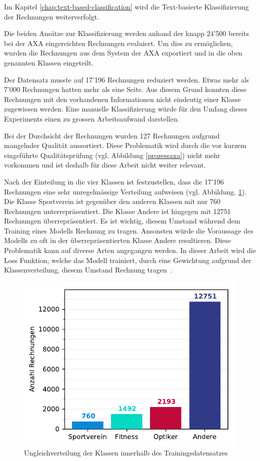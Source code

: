 Im Kapitel \ref{chap:text-based-classification} wird die Text-basierte Klassifizierung der Rechnungen weiterverfolgt.

Die beiden Ansätze zur Klassifizierung werden anhand der knapp 24'500 bereits bei der AXA eingereichten Rechnungen evaluiert. Um dies zu ermöglichen, wurden die Rechnungen aus dem System der AXA exportiert und in die oben genannten Klassen eingeteilt. 

Der Datensatz musste auf 17'196 Rechnungen reduziert werden. Etwas mehr als 7'000 Rechnungen hatten mehr als eine Seite. Aus diesem Grund konnten diese Rechnungen mit den vorhandenen Informationen nicht eindeutig einer Klasse zugewiesen werden. Eine manuelle Klassifizierung würde für den Umfang dieses Experiments einen zu grossen Arbeitsaufwand darstellen.

Bei der Durchsicht der Rechnungen wurden 127 Rechnungen aufgrund mangelnder Qualität aussortiert. Diese Problematik wird durch die vor kurzem eingeführte Qualitätsprüfung (vgl. Abbildung \ref{prozessaxa}) nicht mehr vorkommen und ist deshalb für diese Arbeit nicht weiter relevant.

Nach der Einteilung in die vier Klassen ist festzustellen, dass die 17'196 Rechnungen eine sehr unregelmässige Verteilung aufweisen (vgl. Abbildung. \ref{class-distribution}). Die Klasse Sportverein ist gegenüber den anderen Klassen mit nur 760 Rechnungen unterrepräsentiert. Die Klasse Andere ist hingegen mit 12751 Rechnungen überrepräsentiert. Es ist wichtig, diesem Umstand während dem Training eines Modells Rechnung zu tragen. Ansonsten würde die Voraussage des Modells zu oft in der überrepräsentierten Klasse Andere resultieren. Diese Problematik kann auf diverse Arten angegangen werden. In dieser Arbeit wird die Loss Funktion, welche das Modell trainiert, durch eine Gewichtung aufgrund der Klassenverteilung, diesem Umstand Rechnung tragen~\autocite{Buda2018}.

\begin{figure}[h]
    \captionsetup{width=.9\linewidth}
    \caption{Ungleichverteilung der Klassen innerhalb des Trainingsdatensatzes}
    \label{class-distribution}
    \centering
    \includegraphics[scale=1]{graphics/matplot/class-weight.pdf}
\end{figure}
